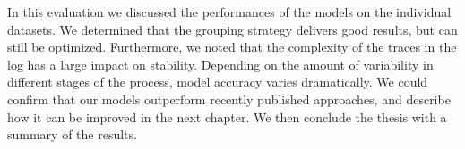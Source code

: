In this evaluation we discussed the performances of the models on the individual datasets.
We determined that the grouping strategy delivers good results, but can still be optimized.
Furthermore, we noted that the complexity of the traces in the log has a large impact on stability.
Depending on the amount of variability in different stages of the process, model accuracy varies dramatically.
We could confirm that our models outperform recently published approaches, and describe how it can be improved in the next chapter.
We then conclude the thesis with a summary of the results.
